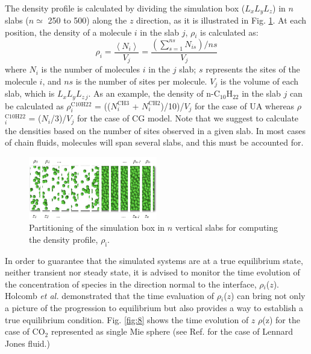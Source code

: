 \documentclass[9pt,tutorial]{livecoms}
\begin{document}
The density profile is calculated by dividing the simulation box
($L_{x}L_{y}L_{z}$) in $n$ slabs
($n{\simeq}$ 250 to 500) along the $z$ direction, as it is
illustrated in Fig. \ref{fig:7}. At each position, the density of a molecule
$i$ in the slab $j$, {${\rho}$}$_{i}$  is calculated as:
\begin{equation}
\rho_{i}=\frac{\left\langle N_{i}\right\rangle }{V_{j}}=\frac{\left(\sum_{s=1}^{ns}N_{is}\right)/ns}{V_{j}}
\end{equation}
where $N_{i}$ is the number of molecules $i$ in the $j$
slab; $s$ represents the sites of the molecule $i$, and
$ns$ is the number of sites per molecule. $V_{j}$ is the volume of each
slab, which is $L_{x}L_{y}L_{z\,j}$. As an
example, the density of n-C$_{10}$H$_{22}$ in the slab $j$ can be
calculated as {${\rho}$}$_{i}^{\mathrm{C10H22}}$
= (($N_{i}^{\mathrm{CH3}}$
+ $N_{i}^{\mathrm{CH2}}$)/10)/$V_{j}$ for the case of UA
whereas {${\rho}$}$_{i}^{\mathrm{C10H22}}$
= ($N_{i}$/3)/$V_{j}$ for the case of CG model.
Note that we suggest to calculate the densities based on the number of sites observed
in a given slab. In most cases of chain fluids, molecules will span several slabs,
and this must be accounted for.

\begin{figure}
\includegraphics[width=0.5\textwidth]{gfx/image51.png}
\caption{Partitioning of the simulation box in $n$ vertical slabs for computing the density profile, ${\rho}_{\mathrm{i}}$.}
\label{fig:7}
\end{figure}

In order to guarantee that the simulated systems are at a true equilibrium
state, neither transient nor steady state, it is advised to monitor the time
evolution of the concentration of species in the direction normal to the
interface, {${\rho}$}$_{i}$($z$). Holcomb \textit{et al.} \citep{holcomb1993} demonstrated that the time evaluation of
{${\rho}$}$_{i}$($z$) can bring not only a picture of the progression to
equilibrium but also provides a way to establish a true equilibrium condition.
Fig. \ref{fig:8} shows the time evolution of $z$ \textendash{} {${\rho}$}(z)
for the case of CO$_{2}$ represented as single Mie sphere (see Ref. \citep{mejia2005} for the case of
Lennard \textendash{} Jones fluid.) 
\end{document}
